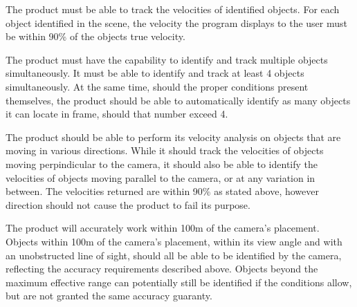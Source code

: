 \documentclass[letterpaper,10pt,onecolumn,draftclsnofoot]{IEEEtran}
\begin{document}
The product must be able to track the velocities of identified objects.
For each object identified in the scene, the velocity the program displays to the user must be within 90\% of the objects true velocity.

The product must have the capability to identify and track multiple objects simultaneously.
It must be able to identify and track at least 4 objects simultaneously.
At the same time, should the proper conditions present themselves, the product should be able to automatically identify as many objects it can locate in frame, should that number exceed 4.

The product should be able to perform its velocity analysis on objects that are moving in various directions.
While it should track the velocities of objects moving perpindicular to the camera, it should also be able to identify the velocities of objects moving parallel to the camera, or at any variation in between.
The velocities returned are within 90\% as stated above, however direction should not cause the product to fail its purpose.

The product will accurately work within 100m of the camera's placement.
Objects within 100m of the camera's placement, within its view angle and with an unobstructed line of sight, should all be able to be identified by the camera, reflecting the accuracy requirements described above.
Objects beyond the maximum effective range can potentially still be identified if the conditions allow, but are not granted the same accuracy guaranty.
\end{document}
